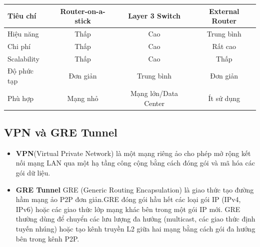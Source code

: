 \begin{center}
\begin{tabular}{|l|c|c|c|}
\hline
\textbf{Tiêu chí} & \textbf{Router-on-a-stick} & \textbf{Layer 3 Switch} & \textbf{External Router} \\
\hline
Hiệu năng & Thấp & Cao & Trung bình \\
\hline
Chi phí & Thấp & Cao & Rất cao \\
\hline
Scalability & Thấp & Cao & Thấp \\
\hline
Độ phức tạp & Đơn giản & Trung bình & Đơn giản \\
\hline
Phù hợp & Mạng nhỏ & Mạng lớn/Data Center & Ít sử dụng \\
\hline
\end{tabular}
\end{center}

\subsection{VPN và GRE Tunnel}
\begin{itemize}
    \item \textbf{VPN}(Virtual Private Network) là một mạng riêng ảo cho phép mở rộng kết nối mạng LAN qua một hạ tầng công cộng bằng cách đóng gói và mã hóa các gói dữ liệu.
     \item \textbf{GRE Tunnel} GRE (Generic Routing Encapsulation) là giao thức tạo đường hầm mạng ảo P2P đơn giản.GRE đóng gói hầu hết các loại gói IP (IPv4, IPv6) hoặc các giao thức lớp mạng khác bên trong một gói IP mới. GRE thường dùng để chuyển các lưu lượng đa hướng (multicast, các giao thức định tuyến nhúng) hoặc tạo kênh truyền L2 giữa hai mạng bằng cách gói đa hướng bên trong kênh P2P.
\end{itemize}
